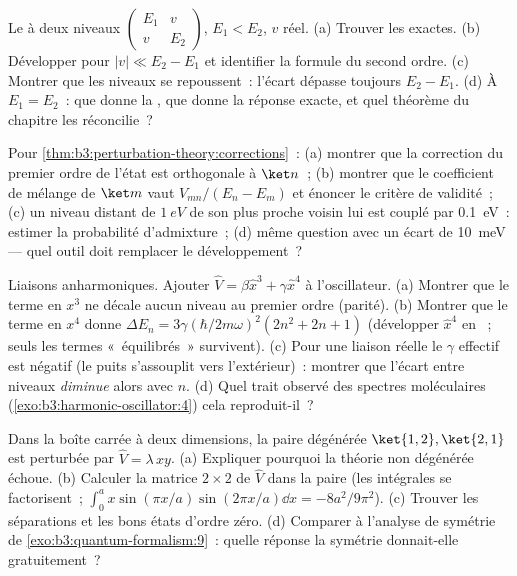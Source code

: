 \begin{exercise}[$\star$]\label{exo:b3:perturbation-theory:3}
Le  à deux niveaux $\begin{pmatrix}E_1 & v\\ v &
E_2\end{pmatrix}$, $E_1 < E_2$, $v$ réel. (a) Trouver les  exactes. (b) Développer pour $|v| \ll E_2 - E_1$ et
identifier la formule du second ordre. (c) Montrer que les niveaux se
repoussent~: l'écart dépasse toujours $E_2 - E_1$. (d) À $E_1 = E_2$~:
que donne la , que donne la réponse exacte,
et quel théorème du chapitre les réconcilie~?
\end{exercise}

\begin{exercise}[$\star$]\label{exo:b3:perturbation-theory:4}
Pour \cref{thm:b3:perturbation-theory:corrections}~: (a) montrer que
la correction du premier ordre de l'état est orthogonale à $\ket n$~;
(b) montrer que le coefficient de mélange de $\ket m$ vaut
$V_{mn}/(E_n - E_m)$ et énoncer le critère de validité~; (c) un niveau
distant de $\qty{1}{eV}$ de son plus proche voisin lui est couplé par
\qty{0.1}{eV}~: estimer la probabilité d'admixture~; (d) même question
avec un écart de \qty{10}{meV} --- quel outil doit remplacer le
développement~?
\end{exercise}

\begin{exercise}[$\star\star$]\label{exo:b3:perturbation-theory:5}
Liaisons anharmoniques. Ajouter $\hat V = \beta\hat x^3 + \gamma\hat x^4$ à
l'oscillateur. (a) Montrer que le terme en $x^3$ ne décale aucun
niveau au premier ordre (parité). (b) Montrer que le terme en $x^4$
donne $\Delta E_n =
3\gamma(\hbar/2m\omega)^2(2n^2 + 2n + 1)$ (développer $\hat x^4$ en
~; seuls les termes «~équilibrés~» survivent).
(c) Pour une liaison réelle le $\gamma$ effectif est négatif (le puits
s'assouplit vers l'extérieur)~: montrer que l'écart entre niveaux
\emph{diminue} alors avec $n$.
(d) Quel trait observé des spectres moléculaires
(\cref{exo:b3:harmonic-oscillator:4}) cela reproduit-il~?
\end{exercise}

\begin{exercise}[$\star\star$]\label{exo:b3:perturbation-theory:6}
Dans la boîte carrée à deux dimensions, la paire dégénérée $\ket{1,2},
\ket{2,1}$ est perturbée par $\hat V = \lambda\,xy$. (a) Expliquer
pourquoi la théorie non dégénérée échoue. (b) Calculer la matrice
$2\times2$ de $\hat V$ dans la paire (les intégrales se factorisent~; $\int_0^a
x\sin(\pi x/a)\sin(2\pi x/a)\dd x = -8a^2/9\pi^2$). (c) Trouver les
séparations et les bons états d'ordre zéro. (d) Comparer à l'analyse
de symétrie de \cref{exo:b3:quantum-formalism:9}~: quelle réponse la
symétrie donnait-elle gratuitement~?
\end{exercise}

